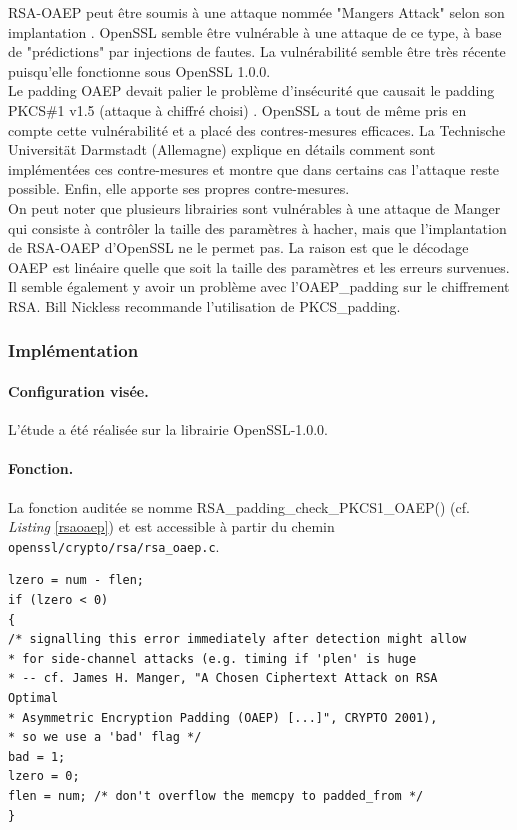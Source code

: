 RSA-OAEP peut être soumis à une attaque nommée "Mangers Attack" selon son implantation \cite{mangers2010falko}. OpenSSL semble être vulnérable à une attaque de ce type, à base de "prédictions" par injections de fautes. La vulnérabilité semble être très récente puisqu'elle fonctionne sous OpenSSL 1.0.0.\\


Le padding OAEP devait palier le problème d'insécurité que causait le padding PKCS\#1 v1.5 (attaque à chiffré choisi) \cite{bleichenbacherPCKS}. OpenSSL a tout de même pris en compte cette vulnérabilité et a placé des contres-mesures efficaces. La Technische Universität Darmstadt (Allemagne) explique en détails comment sont implémentées ces contre-mesures et montre que dans certains cas l'attaque reste possible. Enfin, elle apporte ses propres contre-mesures.\\

On peut noter que plusieurs librairies sont vulnérables à une attaque de Manger qui consiste à contrôler la taille des paramètres à hacher, mais que l'implantation de RSA-OAEP d'OpenSSL ne le permet pas. La raison est que le décodage OAEP est linéaire quelle que soit la taille des paramètres et les erreurs survenues. Il semble également y avoir un problème avec l'OAEP\_padding sur le chiffrement RSA. Bill Nickless recommande l'utilisation de PKCS\_padding. \cite{sourceforgeRSAbroken}	\\


\subsubsection{Implémentation}

\paragraph{Configuration visée.\\}

L'étude a été réalisée sur la librairie OpenSSL-1.0.0.

\paragraph{Fonction.\\}

La fonction auditée se nomme RSA\_padding\_check\_PKCS1\_OAEP() (cf. \textit{Listing} \ref{rsaoaep}) et est accessible à partir du chemin \texttt{openssl/crypto/rsa/rsa\_oaep.c}.


\begin{lstlisting}[style=customc,caption=rsa\_oaep.c,
label=rsaoaep]
lzero = num - flen;
if (lzero < 0)
{
/* signalling this error immediately after detection might allow
* for side-channel attacks (e.g. timing if 'plen' is huge
* -- cf. James H. Manger, "A Chosen Ciphertext Attack on RSA
Optimal
* Asymmetric Encryption Padding (OAEP) [...]", CRYPTO 2001),
* so we use a 'bad' flag */
bad = 1;
lzero = 0;
flen = num; /* don't overflow the memcpy to padded_from */
}
\end{lstlisting}


